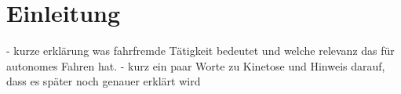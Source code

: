\chapter{Einleitung}\label{cha:Einleitung}

- kurze erklärung was fahrfremde Tätigkeit bedeutet und welche relevanz das für autonomes Fahren hat. 
- kurz ein paar Worte zu Kinetose und Hinweis darauf, dass es später noch genauer erklärt wird
